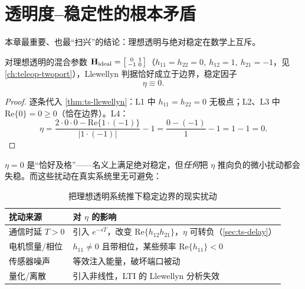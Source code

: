 \section{透明度--稳定性的根本矛盾}
\label{sec:ts-tradeoff}

本章最重要、也最“扫兴”的结论：理想透明与绝对稳定在数学上互斥。

\begin{proposition}\label{prop:ts-ideal-zero}
对理想透明的混合参数 $\mathbf H_{\rm ideal}=\big[\begin{smallmatrix}0&1\\-1&0\end{smallmatrix}\big]$（$h_{11}=h_{22}=0,\ h_{12}=1,\ h_{21}=-1$，见 \cref{ch:teleop-twoport}），Llewellyn 判据恰好成立于边界，稳定因子
\begin{equation}
  \eta\equiv0.
  \label{eq:ts-eta-zero}
\end{equation}
\end{proposition}
\begin{proof}
逐条代入 \cref{thm:ts-llewellyn}：L1 中 $h_{11}=h_{22}=0$ 无极点；L2、L3 中 $\mathrm{Re}\{0\}=0\ge0$（恰在边界）。L4：
\[
  \eta=\frac{2\cdot0\cdot0-\mathrm{Re}\{1\cdot(-1)\}}{|1\cdot(-1)|}-1=\frac{0-(-1)}{1}-1=1-1=0.
\]
\end{proof}

\begin{insight}[$\eta=0$ 意味着什么]
$\eta=0$ 是“恰好及格”——名义上满足绝对稳定，但\emph{任何}把 $\eta$ 推向负的微小扰动都会失稳。而这些扰动在真实系统里无可避免：
\begin{table}[H]\centering\small
\caption{把理想透明系统推下稳定边界的现实扰动}
\label{tab:ts-perturb}
\begin{tabular}{ll}
\toprule
扰动来源 & 对 $\eta$ 的影响 \\
\midrule
通信时延 $T>0$ & 引入 $e^{-sT}$，改变 $\mathrm{Re}\{h_{12}h_{21}\}$，$\eta$ 可转负（\cref{sec:ts-delay}） \\
电机惯量/相位 & $h_{11}\neq0$ 且带相位，某些频率 $\mathrm{Re}\{h_{11}\}<0$ \\
传感器噪声 & 等效注入能量，破坏端口被动 \\
量化/离散 & 引入非线性，LTI 的 Llewellyn 分析失效 \\
\bottomrule
\end{tabular}
\end{table}
\end{insight}

